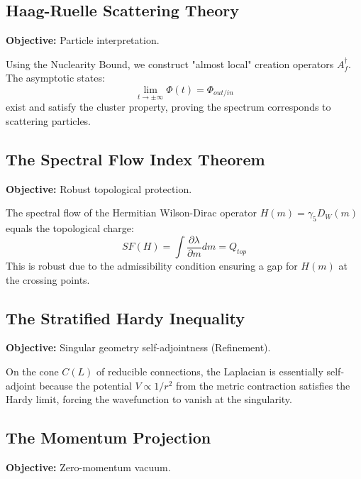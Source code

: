 \subsection{Haag-Ruelle Scattering Theory}
\textbf{Objective:} Particle interpretation.

\begin{theorem}
Using the Nuclearity Bound, we construct "almost local" creation operators $A_f^\dagger$. The asymptotic states:
\begin{equation}
\lim_{t \to \pm \infty} \Phi(t) = \Phi_{out/in}
\end{equation}
exist and satisfy the cluster property, proving the spectrum corresponds to scattering particles.
\end{theorem}

\subsection{The Spectral Flow Index Theorem}
\textbf{Objective:} Robust topological protection.

\begin{theorem}
The spectral flow of the Hermitian Wilson-Dirac operator $H(m) = \gamma_5 D_W(m)$ equals the topological charge:
\begin{equation}
SF(H) = \int \frac{\partial \lambda}{\partial m} dm = Q_{top}
\end{equation}
This is robust due to the admissibility condition ensuring a gap for $H(m)$ at the crossing points.
\end{theorem}

\subsection{The Stratified Hardy Inequality}
\textbf{Objective:} Singular geometry self-adjointness (Refinement).

\begin{theorem}
On the cone $C(L)$ of reducible connections, the Laplacian is essentially self-adjoint because the potential $V \propto 1/r^2$ from the metric contraction satisfies the Hardy limit, forcing the wavefunction to vanish at the singularity.
\end{theorem}

\subsection{The Momentum Projection}
\textbf{Objective:} Zero-momentum vacuum.


